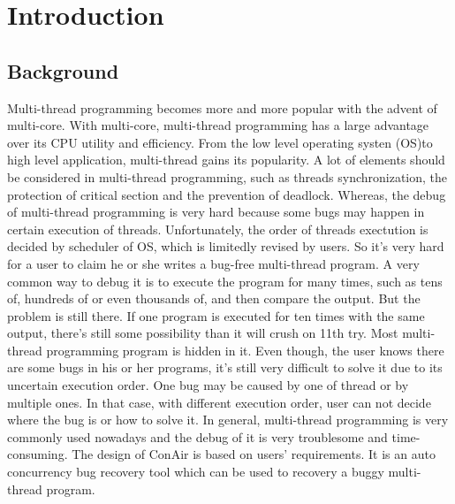 \section{Introduction}

\subsection{Background}
Multi-thread programming becomes more and more popular with the advent of
multi-core. With multi-core, multi-thread programming has a large advantage over
its CPU utility and efficiency. From the low level operating systen (OS)to high
level application, multi-thread gains its popularity. A lot of elements should
be considered in multi-thread programming, such as threads synchronization, the
protection of critical section and the prevention of deadlock. Whereas, the
debug of multi-thread programming is very hard because some bugs may happen in
certain execution of threads. Unfortunately, the order of threads exectution is
decided by scheduler of OS, which is limitedly revised by users. So it's very
hard for a user to claim he or she writes a bug-free multi-thread program. A
very common way to debug it is to execute the program for many times, such as
tens of, hundreds of or even thousands of, and then compare the output. But the
problem is still there. If one program is executed for ten times with the same
output, there's still some possibility than it will crush on 11th try. Most
multi-thread programming program is hidden in it. Even though, the user knows
there are some bugs in his or her programs, it's still very difficult to solve
it due to its uncertain execution order. One bug may be caused by one of thread
or by multiple ones. In that case, with different execution order, user can not
decide where the bug is or how to solve it.  In general, multi-thread
programming is very commonly used nowadays and the debug of it is very
troublesome and time-consuming. The design of ConAir is based on users'
requirements. It is an auto concurrency bug recovery tool which can be used to
recovery a buggy multi-thread program.


